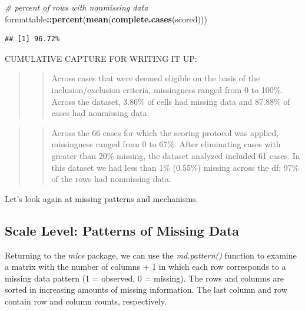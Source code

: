 \documentclass[
  11pt,
]{book}
\newenvironment{Shaded}{\begin{snugshade}}{\end{snugshade}}
\newcommand{\CommentTok}[1]{\textcolor[rgb]{0.37,0.37,0.37}{\textit{#1}}}
\newcommand{\FunctionTok}[1]{\textcolor[rgb]{0.27,0.27,0.27}{\textbf{#1}}}
\newcommand{\NormalTok}[1]{#1}
\newcommand{\SpecialCharTok}[1]{\textcolor[rgb]{0.43,0.43,0.43}{\textbf{#1}}}
\begin{document}
\begin{Shaded}
\begin{Highlighting}[]
\CommentTok{\# percent of rows with nonmissing data}
\NormalTok{formattable}\SpecialCharTok{::}\FunctionTok{percent}\NormalTok{(}\FunctionTok{mean}\NormalTok{(}\FunctionTok{complete.cases}\NormalTok{(scored)))}
\end{Highlighting}
\end{Shaded}

\begin{verbatim}
## [1] 96.72%
\end{verbatim}

CUMULATIVE CAPTURE FOR WRITING IT UP:

\begin{quote}
\begin{quote}
Across cases that were deemed eligible on the basis of the inclusion/exclusion criteria, missingness ranged from 0 to 100\%. Across the dataset, 3.86\% of cells had missing data and 87.88\% of cases had nonmissing data.
\end{quote}
\end{quote}

\begin{quote}
\begin{quote}
Across the 66 cases for which the scoring protocol was applied, missingness ranged from 0 to 67\%. After eliminating cases with greater than 20\% missing, the dataset analyzed included 61 cases. In this dataset we had less than 1\% (0.55\%) missing across the df; 97\% of the rows had nonmissing data.
\end{quote}
\end{quote}

Let's look again at missing patterns and mechanisms.

\hypertarget{scale-level-patterns-of-missing-data}{%
\subsection{Scale Level: Patterns of Missing Data}\label{scale-level-patterns-of-missing-data}}

Returning to the \emph{mice} package, we can use the \emph{md.pattern()} function to examine a matrix with the number of columns + 1 in which each row corresponds to a missing data pattern (1 = observed, 0 = missing). The rows and columns are sorted in increasing amounts of missing information. The last column and row contain row and column counts, respectively.
\end{document}
